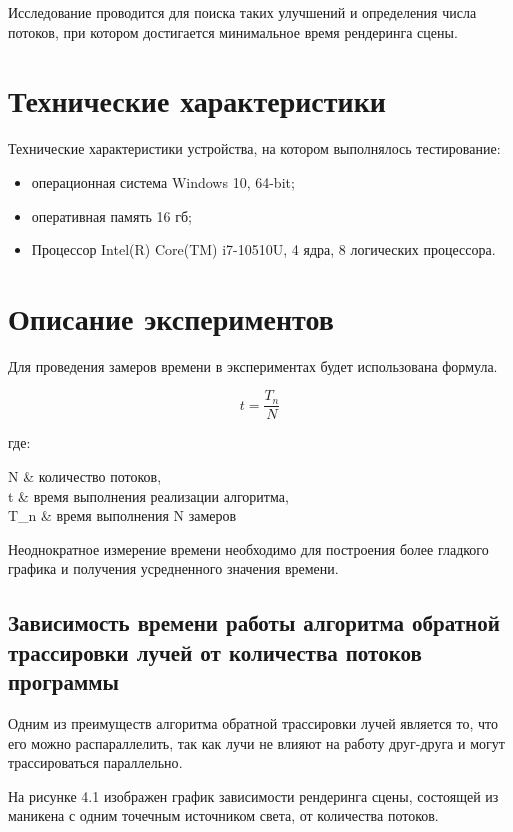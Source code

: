 \documentclass[12pt,a4paper,oneside]{report}
\makeatletter
\newenvironment{conditions*}
{\par\vspace{\abovedisplayskip}\noindent
	\tabularx{\columnwidth}{>{$}l<{$} @{${}-{}$} >{\raggedright\arraybackslash}X}}
{\endtabularx\par\vspace{\belowdisplayskip}}
\makeatother
\begin{document}
	Исследование проводится для поиска таких улучшений и определения числа потоков, при котором достигается минимальное время рендеринга сцены.
	
	
	\section{Технические характеристики}
	 \quad Технические характеристики устройства, на котором выполнялось тестирование:
	\begin{itemize}
		\item операционная система Windows 10, 64-bit;
		\item оперативная память 16 гб;
		\item Процессор Intel(R) Core(TM) i7-10510U, 4 ядра, 8 логических процессора.
	\end{itemize}

	\section{Описание экспериментов}
	 \quad Для проведения замеров времени в экспериментах будет использована формула.
	
	\begin{equation}
	t = \frac{T_n}{N}
	\end{equation}
	
	где:
	\begin{conditions*}
		N & количество потоков,\\
		t & время выполнения реализации алгоритма,\\
		T_n & время выполнения N замеров
	\end{conditions*}

	 Неоднократное измерение времени необходимо для построения более гладкого графика и получения усредненного значения времени.
	
	\subsection{Зависимость времени работы алгоритма обратной трассировки лучей от количества потоков программы}
	
	 \quad Одним из преимуществ алгоритма обратной трассировки лучей является то, что его можно распараллелить, так как лучи не влияют на работу друг-друга и могут трассироваться параллельно\cite{t}.
	
	 На рисунке 4.1 изображен график зависимости рендеринга сцены, состоящей из маникена с одним точечным источником света, от количества потоков.
	
\end{document}
